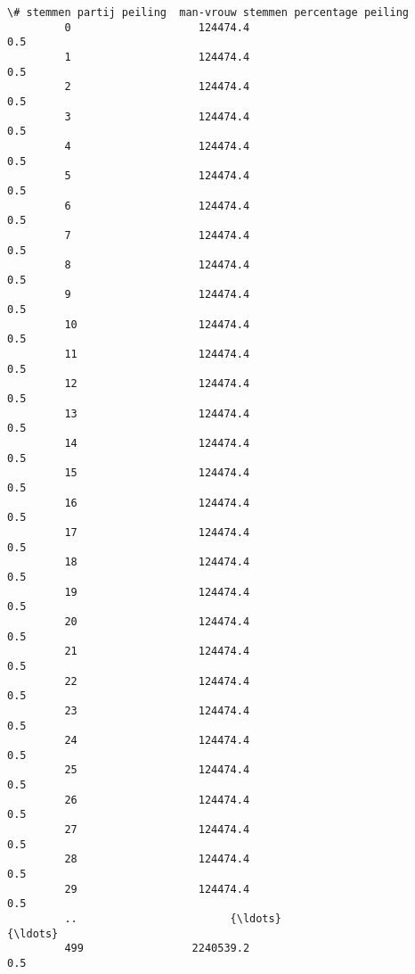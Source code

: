 \documentclass{article}
\begin{document}
\begin{Verbatim}[commandchars=\\\{\}]
              \# stemmen partij peiling  man-vrouw stemmen percentage peiling  
         0                    124474.4                                   0.5  
         1                    124474.4                                   0.5  
         2                    124474.4                                   0.5  
         3                    124474.4                                   0.5  
         4                    124474.4                                   0.5  
         5                    124474.4                                   0.5  
         6                    124474.4                                   0.5  
         7                    124474.4                                   0.5  
         8                    124474.4                                   0.5  
         9                    124474.4                                   0.5  
         10                   124474.4                                   0.5  
         11                   124474.4                                   0.5  
         12                   124474.4                                   0.5  
         13                   124474.4                                   0.5  
         14                   124474.4                                   0.5  
         15                   124474.4                                   0.5  
         16                   124474.4                                   0.5  
         17                   124474.4                                   0.5  
         18                   124474.4                                   0.5  
         19                   124474.4                                   0.5  
         20                   124474.4                                   0.5  
         21                   124474.4                                   0.5  
         22                   124474.4                                   0.5  
         23                   124474.4                                   0.5  
         24                   124474.4                                   0.5  
         25                   124474.4                                   0.5  
         26                   124474.4                                   0.5  
         27                   124474.4                                   0.5  
         28                   124474.4                                   0.5  
         29                   124474.4                                   0.5  
         ..                        {\ldots}                                   {\ldots}  
         499                 2240539.2                                   0.5  

\end{Verbatim}
\end{document}
